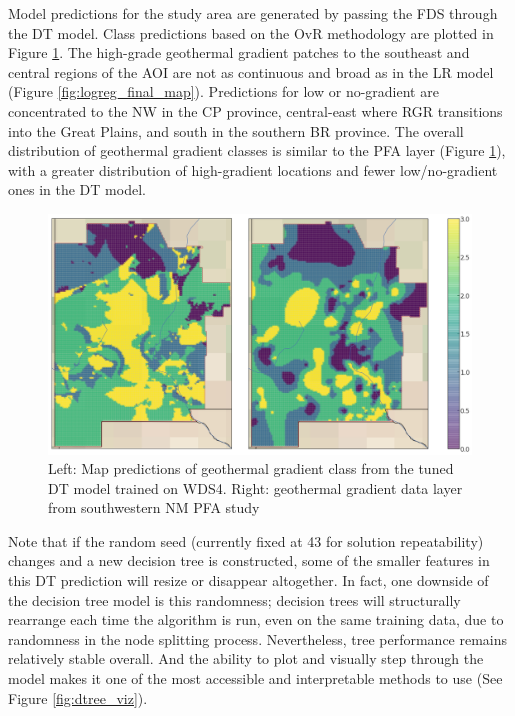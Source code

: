Model predictions for the study area are generated by passing the FDS through the DT model. Class predictions based on the OvR methodology are plotted in Figure \ref{fig:dtree_final_map}. The high-grade geothermal gradient patches to the southeast and central regions of the AOI are not as continuous and broad as in the LR model (Figure \ref{fig:logreg_final_map}). Predictions for low or no-gradient are concentrated to the NW in the CP province, central-east where RGR transitions into the Great Plains, and south in the southern BR province. The overall distribution of geothermal gradient classes is similar to the \citet{bielicki_hydrogeolgic_2015} PFA layer (Figure \ref{fig:dtree_final_map}), with a greater distribution of high-gradient locations and fewer low/no-gradient ones in the DT model.

\begin{figure}[!htp]
\centering
\includegraphics[width=\textwidth]{templates/images/Figure-DT-FinalMap_Joint.png}
\caption[Decision tree prediction map]{Left: Map predictions of geothermal gradient class from the tuned DT model trained on WDS4. Right: geothermal gradient data layer from southwestern NM PFA study \protect\citep{bielicki_hydrogeolgic_2015}}
\label{fig:dtree_final_map}
\end{figure}

Note that if the random seed (currently fixed at 43 for solution repeatability) changes and a new decision tree is constructed, some of the smaller features in this DT prediction will resize or disappear altogether. In fact, one downside of the decision tree model is this randomness; decision trees will structurally rearrange each time the algorithm is run, even on the same training data, due to randomness in the node splitting process. Nevertheless, tree performance remains relatively stable overall. And the ability to plot and visually step through the model makes it one of the most accessible and interpretable methods to use (See Figure \ref{fig:dtree_viz}).

